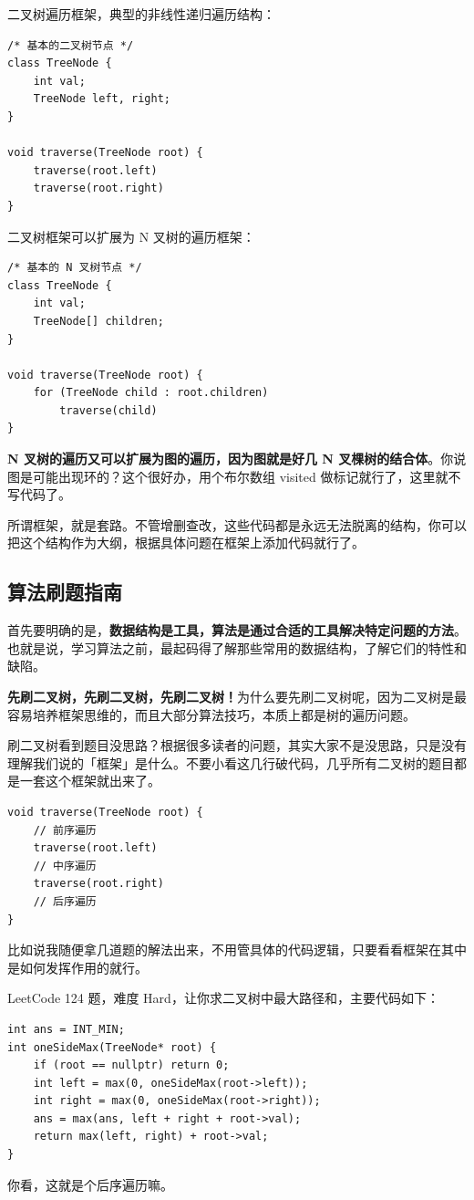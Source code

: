 \documentclass[12pt]{article}
\begin{document}
二叉树遍历框架，典型的非线性递归遍历结构：
\begin{lstlisting}
/* 基本的二叉树节点 */
class TreeNode {
    int val;
    TreeNode left, right;
}

void traverse(TreeNode root) {
    traverse(root.left)
    traverse(root.right)
}
\end{lstlisting}

二叉树框架可以扩展为 N 叉树的遍历框架：
\begin{lstlisting}
/* 基本的 N 叉树节点 */
class TreeNode {
    int val;
    TreeNode[] children;
}

void traverse(TreeNode root) {
    for (TreeNode child : root.children)
        traverse(child)
}
\end{lstlisting}

\textbf{N 叉树的遍历又可以扩展为图的遍历，因为图就是好几 N 叉棵树的结合体}。你说图是可能出现环的？这个很好办，用个布尔数组 visited 做标记就行了，这里就不写代码了。

所谓框架，就是套路。不管增删查改，这些代码都是永远无法脱离的结构，你可以把这个结构作为大纲，根据具体问题在框架上添加代码就行了。

\subsection{算法刷题指南}
首先要明确的是，\textbf{数据结构是工具，算法是通过合适的工具解决特定问题的方法}。也就是说，学习算法之前，最起码得了解那些常用的数据结构，了解它们的特性和缺陷。

\textbf{先刷二叉树，先刷二叉树，先刷二叉树！}为什么要先刷二叉树呢，因为二叉树是最容易培养框架思维的，而且大部分算法技巧，本质上都是树的遍历问题。

刷二叉树看到题目没思路？根据很多读者的问题，其实大家不是没思路，只是没有理解我们说的「框架」是什么。不要小看这几行破代码，几乎所有二叉树的题目都是一套这个框架就出来了。
\begin{lstlisting}
void traverse(TreeNode root) {
    // 前序遍历
    traverse(root.left)
    // 中序遍历
    traverse(root.right)
    // 后序遍历
}
\end{lstlisting}

比如说我随便拿几道题的解法出来，不用管具体的代码逻辑，只要看看框架在其中是如何发挥作用的就行。

LeetCode 124 题，难度 Hard，让你求二叉树中最大路径和，主要代码如下：
\begin{lstlisting}
int ans = INT_MIN;
int oneSideMax(TreeNode* root) {
    if (root == nullptr) return 0;
    int left = max(0, oneSideMax(root->left));
    int right = max(0, oneSideMax(root->right));
    ans = max(ans, left + right + root->val);
    return max(left, right) + root->val;
}
\end{lstlisting}
你看，这就是个后序遍历嘛。
\end{document}
